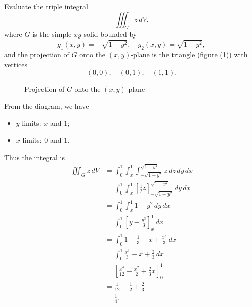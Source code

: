   \begin{example}
    Evaluate the triple integral
      \[
        \iiint_G z \, dV.
      \]
    where $G$ is the simple $xy$-solid bounded by
      \[
        g_1(x, y) = -\sqrt{1 - y^2}, \quad g_2(x, y) = \sqrt{1 - y^2},
      \]
    and the projection of $G$ onto the $(x, y)$-plane is the triangle (figure (\ref{tripleregionxyplane})) with vertices
      \[
        (0, 0), \quad (0, 1), \quad (1, 1).
      \]
  \begin{figure}[H]
    \centering
    \def\svgwidth{0.32\columnwidth}
    
    \caption{Projection of $G$ onto the $(x,y)$-plane}
    \label{tripleregionxyplane}
  \end{figure}

    From the diagram, we have
      \begin{itemize}[topsep=0pt]
        \item $y$-limits: $x$ and $1$;
        \item $x$-limits: $0$ and $1$.
      \end{itemize}
    Thus the integral is
      \begin{align*}
        \iiint_G z \, dV & = \int_0^1 \int_x^1 \int_{-\sqrt{1 - y^2}}^{\sqrt{1 - y^2}} z \, dz \, dy \, dx  \\
        & = \int_0^1 \int_x^1 \left[\frac{1}{2}z\right]_{-\sqrt{1 - y^2}}^{\sqrt{1 - y^2}} \, dy \, dx  \\
        & = \int_0^1 \int_x^1 1 - y^2 \, dy \, dx  \\
        & = \int_0^1 \left[y - \frac{y^3}{3}\right]_x^1 \, dx  \\
        & = \int_0^1 1 - \frac{1}{3} - x + \frac{x^3}{3} \, dx  \\
        & = \int_0^1 \frac{x^3}{3} - x + \frac{2}{3} \, dx  \\
        & = \left[\frac{x^4}{12} - \frac{x^2}{2} + \frac{2}{3}x\right]_0^1  \\
        & = \frac{1}{12} - \frac{1}{2} + \frac{2}{3}  \\
        & = \frac{1}{4}.
      \end{align*}
  \end{example}  




